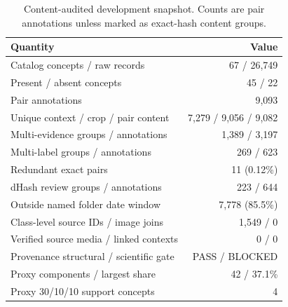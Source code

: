 \begin{table}[t]
\centering
\caption{Content-audited development snapshot. Counts are pair annotations unless marked as exact-hash content groups.}
\label{tab:dataset_audit}
\footnotesize
\begin{tabularx}{\columnwidth}{@{}Y r@{}}
\toprule
Quantity & Value \\
\midrule
Catalog concepts / raw records & 67 / 26,749 \\
Present / absent concepts & 45 / 22 \\
Pair annotations & 9,093 \\
Unique context / crop / pair content & 7,279 / 9,056 / 9,082 \\
Multi-evidence groups / annotations & 1,389 / 3,197 \\
Multi-label groups / annotations & 269 / 623 \\
Redundant exact pairs & 11 (0.12\%) \\
dHash review groups / annotations & 223 / 644 \\
Outside named folder date window & 7,778 (85.5\%) \\
Class-level source IDs / image joins & 1,549 / 0 \\
Verified source media / linked contexts & 0 / 0 \\
Provenance structural / scientific gate & PASS / BLOCKED \\
Proxy components / largest share & 42 / 37.1\% \\
Proxy 30/10/10 support concepts & 4 \\
\bottomrule
\end{tabularx}
\end{table}
